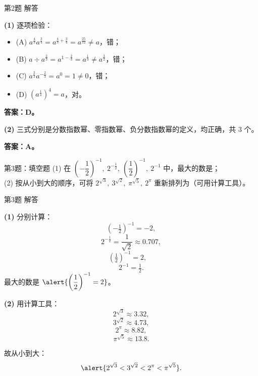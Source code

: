 \documentclass[10pt,aspectratio=169,serif,fleqn]{beamer}
\begin{document}
\begin{frame}[t]{第2题 解答}\vspace{-1.5em}
\begin{tcolorbox}[colback=orange!10,colframe=orange,title=\textbf{解:}]
\textbf{(1)} 逐项检验：
\begin{itemize}
  \item (A) $a^{\frac{4}{3}}a^{\frac{3}{4}}=a^{\frac{4}{3}+\frac{3}{4}}=a^{\frac{25}{12}}\ne a$，错；
  \item (B) $a\div a^{\frac{2}{3}}=a^{1-\frac{2}{3}}=a^{\frac{1}{3}}\ne a^{\frac{3}{2}}$，错；
  \item (C) $a^{\frac{2}{3}}a^{-\frac{2}{3}}=a^{0}=1\ne 0$，错；
  \item (D) $(a^{\frac{1}{4}})^{4}=a$，\alert{对}。
\end{itemize}
\textbf{答案：D。}

\vspace{0.6em}
\textbf{(2)} 三式分别是分数指数幂、零指数幂、负分数指数幂的定义，均正确，共 $3$ 个。

\textbf{答案：A。}
\end{tcolorbox}
\end{frame}

\begin{frame}[t]{第3题：填空题}
(1) 在 $\left(-\dfrac{1}{2}\right)^{-1},\ 2^{-\frac{1}{2}},\ \left(\dfrac{1}{2}\right)^{-1},\ 2^{-1}$ 中，最大的数是\underline{\hspace{3em}}；\\[8pt]

(2) 按从小到大的顺序，可将 $2^{\sqrt{3}},\ 3^{\sqrt{2}},\ \pi^{\sqrt{5}},\ 2^{\pi}$ 重新排列为\underline{\hspace{6em}}（可用计算工具）。
\end{frame}

\begin{frame}[t]{第3题 解答}\vspace{-1.5em}
\begin{tcolorbox}[colback=orange!10,colframe=orange,sidebyside,title=\textbf{解:}]
\textbf{(1)} 分别计算：
\[\left(-\tfrac12\right)^{-1}=-2,\]
\[2^{-\frac12}=\frac{1}{\sqrt2}\approx 0.707,\]
\[\left(\tfrac12\right)^{-1}=2,\quad\]
\[2^{-1}=\tfrac12.\]
最大的数是 $\alert{\left(\dfrac{1}{2}\right)^{-1}=2}$。

\tcblower
\textbf{(2)} 用计算工具：
\[
2^{\sqrt3}\approx 3.32,\]
\[3^{\sqrt2}\approx 4.73,\]
\[ 2^{\pi}\approx 8.82,\]
\[\pi^{\sqrt5}\approx 13.8.\]

故从小到大：
\[
\alert{2^{\sqrt{3}}<3^{\sqrt{2}}<2^{\pi}<\pi^{\sqrt{5}}}.
\]
\end{tcolorbox}
\end{frame}
\end{document}

